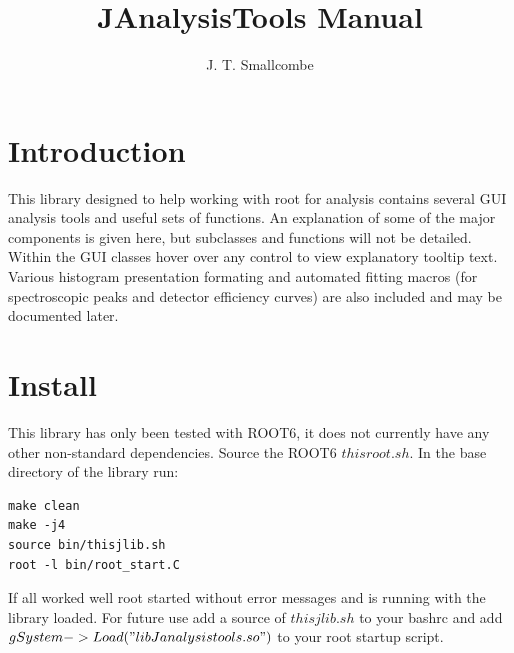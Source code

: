 \documentclass[a4paper,10pt]{article}
\title{JAnalysisTools Manual}
\author{J. T. Smallcombe}
\begin{document}
\maketitle
\tableofcontents

\section{Introduction}
This library designed to help working with root for analysis contains several GUI analysis tools and useful sets of functions. An explanation of some of the major components is given here, but subclasses and functions will not be detailed.
Within the GUI classes hover over any control to view explanatory tooltip text.
Various histogram presentation formating and automated fitting macros (for spectroscopic peaks and detector efficiency curves) are also included and may be documented later. 

\section{Install}
This library has only been tested with ROOT6, it does not currently have any other non-standard dependencies.
Source the ROOT6 $thisroot.sh$.
In the base directory of the library run:
\lstset{language=bash}
\begin{lstlisting}
make clean
make -j4
source bin/thisjlib.sh
root -l bin/root_start.C
\end{lstlisting}
If all worked well root started without error messages and is running with the library loaded.
For future use add a source of $thisjlib.sh$ to your bashrc and add $gSystem->Load("libJanalysistools.so")$ to your root startup script.

\newpage
\end{document}
